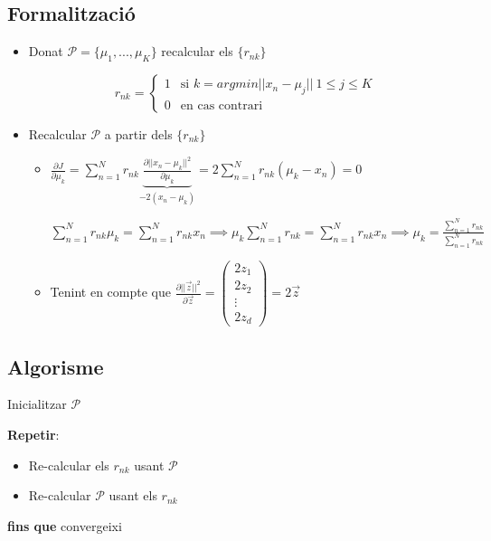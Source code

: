 \documentclass[a4paper]{article}
\begin{document}
\subsection{Formalització}
\begin{itemize}
	\item Donat $\mathcal{P} = \{ \mu_1, ..., \mu_K \}$ recalcular els $\{r_{nk}\}$
	
	$$ r_{nk} =
	\begin{cases}
	1 & \text{si } k = argmin ||x_n - \mu_j||\ 1 \le j \le K \\ 0 & \text{en cas contrari}
	\end{cases}$$
	
	\item Recalcular $\mathcal{P}$ a partir dels $\{r_{nk}\}$
	
	\begin{itemize}
		\item $\frac{\partial J}{\partial \mu_k} = \sum_{n=1}^N r_{nk} \underbrace{\frac{\partial ||x_n - \mu_k||^2}{\partial \mu_k}}_{-2(x_n - \mu_k)} = 2\sum_{n=1}^N r_{nk} (\mu_k - x_n) = 0$
		
		$\sum_{n=1}^N r_{nk}\mu_k = \sum_{n=1}^N r_{nk}x_n \implies \mu_k\sum_{n=1}^N r_{nk} = \sum_{n=1}^N r_{nk}x_n \implies \boxed{\mu_k = \frac{\sum_{n=1}^N r_{nk}}{\sum_{n=1}^N r_{nk}}}$
		
		\item Tenint en compte que $\frac{\partial ||\vec{z}||^2}{\partial \vec{z}} = \begin{pmatrix}
		2z_1 \\ 2z_2 \\ \vdots \\ 2z_d
		\end{pmatrix} = 2\vec{z}$
	\end{itemize}
\end{itemize}

\subsection{Algorisme}

Inicialitzar $\mathcal{P}$

\textbf{Repetir}:
\begin{itemize}
	\item Re-calcular els $r_{nk}$ usant $\mathcal{P}$
	\item Re-calcular $\mathcal{P}$ usant els $r_{nk}$
\end{itemize}
\textbf{fins que} convergeixi
\end{document}
